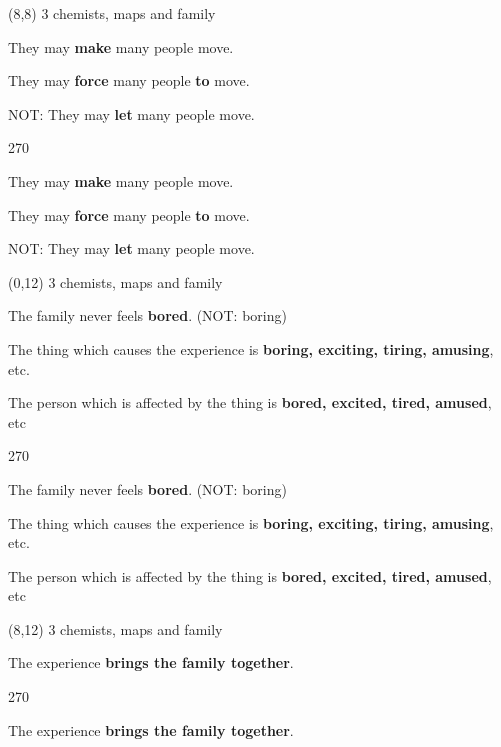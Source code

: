 \documentclass[a4paper]{article}
\newenvironment{itemize*}%
{\begin{itemize}%
 \setlength{\itemsep}{0.0cm}%
 \setlength{\parsep}{0pt}%
 \setlength{\parskip}{0pt}}%
{\end{itemize}}
\newcommand{\mycard}[3]{%
	\small #1 #2
	\par
	\parbox[t][6.8cm][c]{9.5cm}{%
	\par
	\myleft{#3}
	\par
	\myright{#3}
	}
}
\newcommand{\myleft}[1]{%
	\begin{sideways}
	\hspace*{-0.9cm}
		\parbox[t][2.7cm][t]{6.5cm}{%
		\Large #1
		}
	\end{sideways}
}
\newcommand{\myright}[1]{%
	\hspace*{6.5cm}
	\begin{turn}{270}
	\hspace*{-7.1cm}
		\parbox[t][2.7cm][t]{6.5cm}{%
		\Large #1
		}
	\end{turn}
}
\begin{document}
\begin{textblock}{8}(8,8)
\mycard{3}{chemists, maps and family}{
\begin{itemize*}
\item They may \textbf{make} many people move.
\item They may \textbf{force} many people \textbf{to} move.
\item NOT: They may \textbf{let} many people move.
\end{itemize*}
}
\end{textblock}

\begin{textblock}{8}(0,12)
\mycard{3}{chemists, maps and family}{
\large
\begin{itemize*}
\item The family never feels \textbf{bored}. (NOT: boring)
\item The thing which causes the experience is \textbf{boring, exciting, tiring, amusing}, etc.
\item The person which is affected by the thing is \textbf{bored, excited, tired, amused}, etc
\end{itemize*}
}
\end{textblock}

\begin{textblock}{8}(8,12)
\mycard{3}{chemists, maps and family}{
\begin{itemize*}
\item The experience \textbf{brings the family together}.
\end{itemize*}
}
\end{textblock}

\null
\newpage
\end{document}
